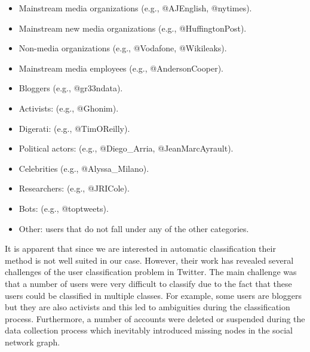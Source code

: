 \begin{itemize}
 \item Mainstream media organizations (e.g., @AJEnglish, @nytimes).
 \item Mainstream new media organizations (e.g., @HuffingtonPost).
 \item Non-media organizations (e.g., @Vodafone, @Wikileaks).
 \item Mainstream media employees (e.g., @AndersonCooper).
 \item Bloggers (e.g., @gr33ndata).
 \item Activists: (e.g., @Ghonim).
 \item Digerati:  (e.g., @TimOReilly).
 \item Political actors: (e.g., @Diego\_Arria, @JeanMarcAyrault).
 \item Celebrities (e.g., @Alyssa\_Milano).
 \item Researchers: (e.g., @JRICole).
 \item Bots: (e.g., @toptweets).
 \item Other: users that do not fall under any of the other categories. 	 
\end{itemize}\vspace{15pt}
It is apparent that since we are interested in automatic classification their method is not well suited in our case. However, their work has revealed several challenges of the user classification problem in Twitter. The main challenge was that a number of users were very difficult to classify due to the fact that these users could be classified in multiple classes. For example, some users are bloggers but they are also activists and this led to ambiguities during the classification process. Furthermore, a number of accounts were deleted or suspended during the data collection process which inevitably introduced missing nodes in the social network graph. \\\\
